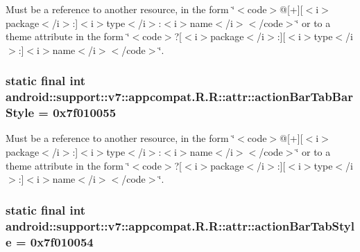 Must be a reference to another resource, in the form \char`\"{}$<$code$>$@\mbox{[}+\mbox{]}\mbox{[}$<$i$>$package$<$/i$>$:\mbox{]}$<$i$>$type$<$/i$>$:$<$i$>$name$<$/i$>$$<$/code$>$\char`\"{} or to a theme attribute in the form \char`\"{}$<$code$>$?\mbox{[}$<$i$>$package$<$/i$>$:\mbox{]}\mbox{[}$<$i$>$type$<$/i$>$:\mbox{]}$<$i$>$name$<$/i$>$$<$/code$>$\char`\"{}. \hypertarget{classandroid_1_1support_1_1v7_1_1appcompat_1_1_r_1_1attr_cb6a203259f74a11b5b425e3879d09b9}{
\subsubsection[{actionBarTabBarStyle}]{\setlength{\rightskip}{0pt plus 5cm}static final int android::support::v7::appcompat.R.R::attr::actionBarTabBarStyle = 0x7f010055}}
\label{classandroid_1_1support_1_1v7_1_1appcompat_1_1_r_1_1attr_cb6a203259f74a11b5b425e3879d09b9}


Must be a reference to another resource, in the form \char`\"{}$<$code$>$@\mbox{[}+\mbox{]}\mbox{[}$<$i$>$package$<$/i$>$:\mbox{]}$<$i$>$type$<$/i$>$:$<$i$>$name$<$/i$>$$<$/code$>$\char`\"{} or to a theme attribute in the form \char`\"{}$<$code$>$?\mbox{[}$<$i$>$package$<$/i$>$:\mbox{]}\mbox{[}$<$i$>$type$<$/i$>$:\mbox{]}$<$i$>$name$<$/i$>$$<$/code$>$\char`\"{}. \hypertarget{classandroid_1_1support_1_1v7_1_1appcompat_1_1_r_1_1attr_fb280c0e0de0db9a1636ee632cd1b8b6}{
\subsubsection[{actionBarTabStyle}]{\setlength{\rightskip}{0pt plus 5cm}static final int android::support::v7::appcompat.R.R::attr::actionBarTabStyle = 0x7f010054}}
\label{classandroid_1_1support_1_1v7_1_1appcompat_1_1_r_1_1attr_fb280c0e0de0db9a1636ee632cd1b8b6}


